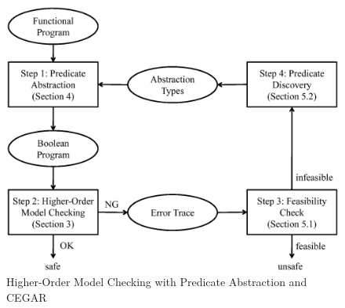 \begin{figure}
\includegraphics[scale=0.35]{overall.eps}
\caption{Higher-Order Model Checking with Predicate Abstraction and CEGAR}
\label{fig:cegar}
\end{figure}


